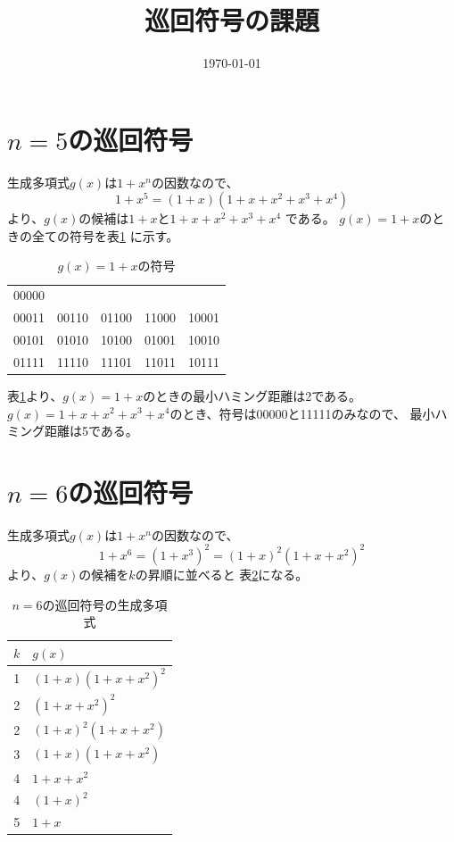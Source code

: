 \documentclass[a4paper,11pt]{jsarticle}
\begin{document}
\title{巡回符号の課題}
\author{}
\date{\today}
\maketitle


\section{$n=5$の巡回符号}
生成多項式$g(x)$は$1+x^n$の因数なので、
\[
  1+x^5=(1+x)(1+x+x^2+x^3+x^4)
\]
より、$g(x)$の候補は$1+x$と$1+x+x^2+x^3+x^4$
である。
$g(x)=1+x$のときの全ての符号を表\ref{table:n5g1}
に示す。
\begin{table}[hbtp]
  \caption{$g(x)=1+x$の符号}
  \label{table:n5g1}
  \centering
  \begin{tabular}{ccccc}
    00000 &&&& \\
    00011 & 00110 & 01100 & 11000 & 10001 \\
    00101 & 01010 & 10100 & 01001 & 10010 \\
    01111 & 11110 & 11101 & 11011 & 10111
  \end{tabular}
\end{table}
表\ref{table:n5g1}より、$g(x)=1+x$のときの最小ハミング距離は2である。
$g(x)=1+x+x^2+x^3+x^4$のとき、符号は00000と11111のみなので、
最小ハミング距離は5である。

\section{$n=6$の巡回符号}
生成多項式$g(x)$は$1+x^n$の因数なので、
\[
  1+x^6=(1+x^3)^2=(1+x)^2(1+x+x^2)^2
\]
より、$g(x)$の候補を$k$の昇順に並べると
表\ref{table:n6g}になる。
\begin{table}[hbtp]
  \caption{$n=6$の巡回符号の生成多項式}
  \label{table:n6g}
  \centering
  \begin{tabular}{c|l}
    $k$ & $g(x)$ \\ \hline
    1 & $(1+x)(1+x+x^2)^2$ \\
    2 & $(1+x+x^2)^2$ \\
    2 & $(1+x)^2(1+x+x^2)$ \\
    3 & $(1+x)(1+x+x^2)$ \\
    4 & $1+x+x^2$ \\
    4 & $(1+x)^2$ \\
    5 & $1+x$
  \end{tabular}
\end{table}
\end{document}
